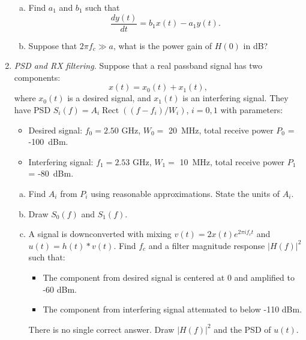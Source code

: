 \documentclass[11pt]{article}
\def\Rect{\mathop{Rect}}
\begin{document}
\begin{enumerate}
\begin{enumerate}[(a)]
\item Find $a_1$ and $b_1$ such that
\[
    \frac{dy(t)}{dt} = b_1 x(t)- a_1y(t).
\]

\item Suppose that $2\pi f_c \gg a$, what is the power gain of $H(0)$ in dB?
\end{enumerate}

\item \emph{PSD and RX filtering.}
Suppose that a real passband signal has two components:
\[
    x(t)=x_0(t)+x_1(t),
\]
where $x_0(t)$ is a desired signal, and $x_1(t)$ is an interfering signal.  They have PSD
$S_i(f)=A_i\Rect((f-f_i)/W_i)$, $i=0,1$ with parameters:
\begin{itemize}
\item Desired signal: $f_0 = 2.50$ GHz, $W_0 = $ 20~MHz, total receive power $P_0$ = -100~dBm.
\item Interfering signal: $f_1 = 2.53$ GHz, $W_1 = $ 10~MHz, total receive power $P_1$ = -80~dBm.
\end{itemize}
\begin{enumerate}[(a)]
\item Find $A_i$ from $P_i$ using reasonable approximations.  State the units of $A_i$.
\item Draw $S_0(f)$ and $S_1(f)$.
\item A signal is downconverted with mixing $v(t)=2x(t)e^{2\pi i f_ct}$ and $u(t)=h(t)*v(t)$.
Find $f_c$ and a filter magnitude response $|H(f)|^2$ such that:
\begin{itemize}
\item The component from desired signal is centered at 0 and amplified to -60 dBm.
\item The component from interfering signal attenuated to below -110 dBm.
\end{itemize}
There is no single correct answer.  Draw $|H(f)|^2$ and the PSD of $u(t)$.
\end{enumerate}


\end{enumerate}
\end{document}
